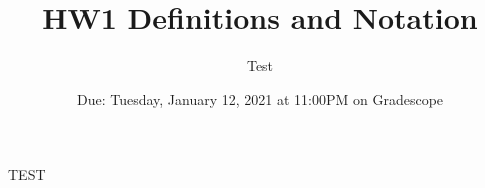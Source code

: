 \documentclass[12pt, oneside]{article}
\title{HW1 Definitions and Notation}
\author{Test}
\date{Due: Tuesday, January 12, 2021 at 11:00PM on Gradescope}
\begin{document}
\maketitle

TEST
\end{document}
